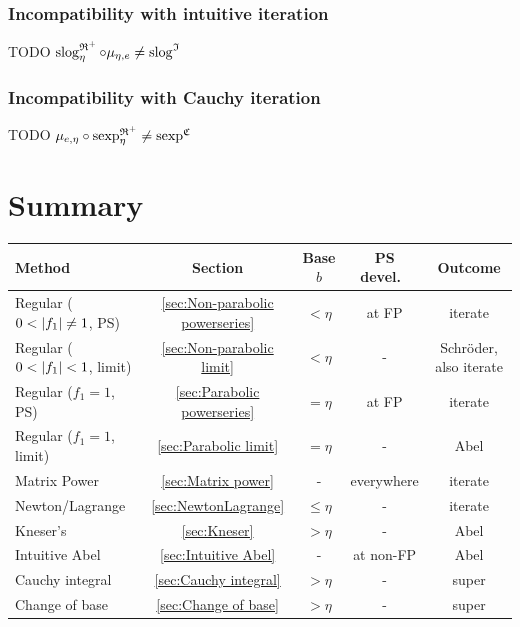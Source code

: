 \documentclass{article}
\numberwithin{equation}{section}
\begin{document}
\subsubsection{Incompatibility with intuitive iteration}
TODO $\operatorname{slog}^{\mathfrak{R}^+}_\eta \circ \mu_{\eta,e}\neq \operatorname{slog}^{\mathfrak{I}}$ 

\subsubsection{Incompatibility with Cauchy iteration}
TODO $\mu_{e,\eta}\circ \operatorname{sexp}^{\mathfrak{R}^+}_\eta\neq \operatorname{sexp}^{\mathfrak{C}}$ 


\section{Summary}
\begin{tabular}{l|c|c|c|c}
Method & Section & Base $b$ & PS devel.\ & Outcome\\ \hline
Regular ($0<\left|f_1\right|\neq 1$, PS) &\ref{sec:Non-parabolic powerseries}& $<\eta$ & at FP & iterate\\ \hline
Regular ($0<\left|f_1\right|<1$, limit) &\ref{sec:Non-parabolic limit}& $<\eta$ & - & Schr\"oder, also
iterate\\ \hline
Regular ($f_1=1$, PS) &\ref{sec:Parabolic powerseries}& $=\eta$ & at FP & iterate\\ \hline
Regular ($f_1=1$, limit) &\ref{sec:Parabolic limit}& $=\eta$ & - & Abel\\ \hline
Matrix Power &\ref{sec:Matrix power}& - & everywhere & iterate\\ \hline
Newton/Lagrange &\ref{sec:NewtonLagrange}& $\le \eta$ & - & iterate\\ \hline
Kneser's &\ref{sec:Kneser}& $>\eta$ & - & Abel \\ \hline
Intuitive Abel &\ref{sec:Intuitive Abel}& - & at non-FP & Abel \\ \hline
Cauchy integral &\ref{sec:Cauchy integral}& $>\eta$ & - & super\\ \hline
Change of base &\ref{sec:Change of base}& $>\eta$ & - & super\\ \hline
\end{tabular}
\end{document}
